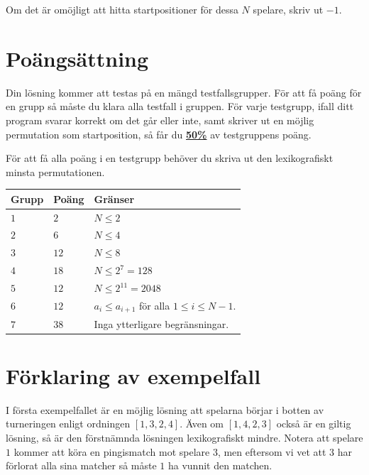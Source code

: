 Om det är omöjligt att hitta startpositioner för dessa $N$ spelare, skriv ut $-1$.

\section*{Poängsättning}
Din lösning kommer att testas på en mängd testfallsgrupper.
För att få poäng för en grupp så måste du klara alla testfall i gruppen.
För varje testgrupp, ifall ditt program svarar korrekt om det går eller inte, 
samt skriver ut en möjlig permutation som startposition, så får du \underline{\textbf{50\%}} av testgruppens poäng.

För att få alla poäng i en testgrupp behöver du skriva ut den lexikografiskt minsta permutationen.

\noindent
\begin{tabular}{| l | l | p{12cm} |}
  \hline
  \textbf{Grupp} & \textbf{Poäng} & \textbf{Gränser} \\ \hline
  $1$    & $2$        & $N \leq 2$ \\ \hline
  $2$    & $6$        & $N \leq 4$ \\ \hline
  $3$    & $12$       & $N \leq 8$ \\ \hline
  $4$    & $18$       & $N \leq 2^7 = 128$ \\ \hline
  $5$    & $12$       & $N \leq 2^{11} = 2048$ \\ \hline
  $6$    & $12$       & $a_i \leq a_{i+1}$ för alla $1 \leq i \leq N-1$. \\ \hline 
  $7$    & $38$       & Inga ytterligare begränsningar. \\ \hline %
\end{tabular}


\section*{Förklaring av exempelfall}
I första exempelfallet är en möjlig lösning att spelarna börjar i botten av turneringen enligt ordningen $[1, 3, 2, 4]$. Även om $[1, 4, 2, 3]$ också är en giltig lösning, så är den förstnämnda lösningen lexikografiskt mindre.
Notera att spelare $1$ kommer att köra en pingismatch mot spelare $3$, men eftersom vi vet att $3$ har förlorat alla sina matcher så måste $1$ ha vunnit den matchen.

